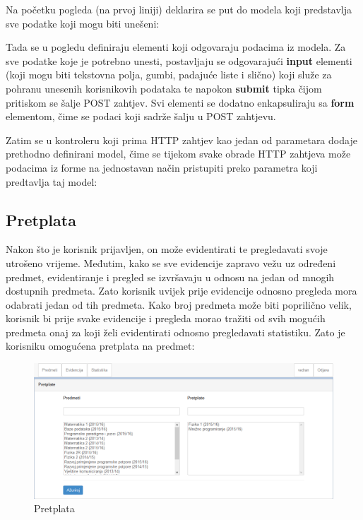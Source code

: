 \documentclass[times, utf8, zavrsni, numeric]{fer}
\begin{document}
\lstset{style=csharp}


Na početku pogleda (na prvoj liniji) deklarira se put do modela koji predstavlja sve podatke koji mogu biti unešeni:

\lstset{style=html}


Tada se u pogledu definiraju elementi koji odgovaraju podacima iz modela. Za sve podatke koje je potrebno unesti, postavljaju se odgovarajući \textbf{input} elementi (koji mogu biti tekstovna polja, gumbi, padajuće liste i slično) koji služe za pohranu unesenih korisnikovih podataka te napokon \textbf{submit} tipka čijom pritiskom se šalje POST zahtjev. Svi elementi se dodatno enkapsuliraju sa \textbf{form} elementom, čime se podaci koji sadrže šalju u POST zahtjevu.

\lstset{style=html}


Zatim se u kontroleru koji prima HTTP zahtjev kao jedan od parametara dodaje prethodno definirani model, čime se tijekom svake obrade HTTP zahtjeva može podacima iz forme na jednostavan način pristupiti preko parametra koji predtavlja taj model:

\lstset{style=csharp}


\subsection{Pretplata}
Nakon što je korisnik prijavljen, on može evidentirati te pregledavati svoje utrošeno vrijeme. Međutim, kako se sve evidencije zapravo vežu uz određeni predmet, evidentiranje i pregled se izvršavaju u odnosu na jedan od mnogih dostupnih predmeta. Zato korisnik uvijek prije evidencije odnosno pregleda mora odabrati jedan od tih predmeta. Kako broj predmeta može biti poprilično velik, korisnik bi prije svake evidencije i pregleda morao tražiti od svih mogućih predmeta onaj za koji želi evidentirati odnosno pregledavati statistiku. Zato je korisniku omogućena pretplata na predmet:

\begin{figure}[H]
\centering
\includegraphics[width=\textwidth,height=\textheight,keepaspectratio]{img/pretplata-web.png}
\caption{Pretplata}
\label{fig:pretplata-web}
\end{figure}
\end{document}
